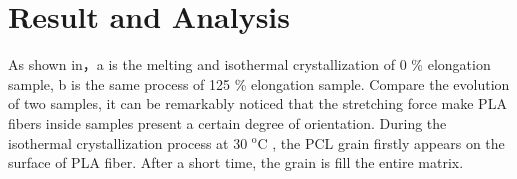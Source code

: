 \documentclass{Head}
\begin{document}
  
  
   
  \label{sec:experiment}
  \section{Result and Analysis} %
  As shown in，a is the melting and isothermal crystallization of 0 \% elongation sample, b is
  the same process of 125 \% elongation sample. Compare the evolution of two samples, it can be
  remarkably noticed that the stretching force make PLA fibers inside samples  present a certain degree of orientation.
  During the isothermal crystallization process at 30 $\mathrm{^o C}$ , the PCL grain firstly appears on the surface of
  PLA fiber. After a short time, the grain is fill the entire matrix.
\end{document}

